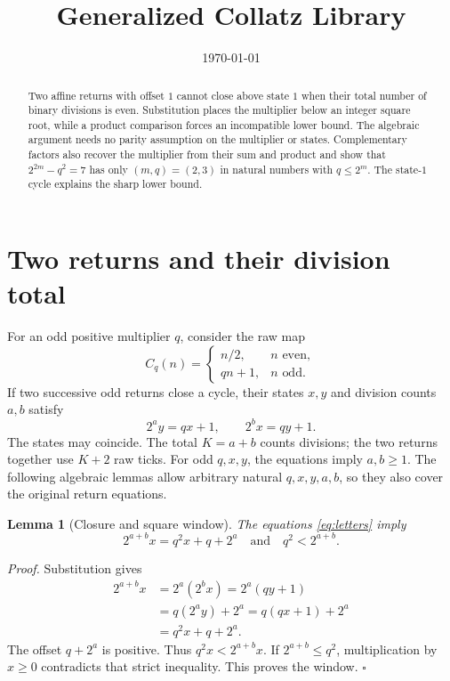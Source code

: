 \documentclass[11pt,letterpaper]{article}
\title{Generalized Collatz Library}
\author{}
\date{\today}
\newtheorem{lemma}[theorem]{Lemma}
\newenvironment{proof}{\noindent\textit{Proof.}}{\hfill\(\square\)}
\begin{document}
\maketitle

\begin{abstract}
Two affine returns with offset \(1\) cannot close above state \(1\) when
 their total number of binary divisions is even. Substitution places the
multiplier below an integer square root, while a product comparison forces
an incompatible lower bound. The algebraic argument needs no parity
assumption on the multiplier or states. Complementary factors also recover
the multiplier from their sum and product and show that
\(2^{2m}-q^2=7\) has only \((m,q)=(2,3)\) in natural numbers with
\(q\le2^m\). The state-\(1\) cycle explains the sharp lower bound.
\end{abstract}

\section{Two returns and their division total}

For an odd positive multiplier \(q\), consider the raw map
\[
C_q(n)=
\begin{cases}
n/2,&n\text{ even},\\
qn+1,&n\text{ odd}.
\end{cases}
\]
If two successive odd returns close a cycle, their states \(x,y\) and
division counts \(a,b\) satisfy
\begin{equation}
\label{eq:letters}
2^a y=qx+1,\qquad 2^b x=qy+1.
\end{equation}
The states may coincide. The total \(K=a+b\) counts divisions; the two
returns together use \(K+2\) raw ticks. For odd \(q,x,y\), the equations
imply \(a,b\ge1\). The following algebraic lemmas allow arbitrary natural
\(q,x,y,a,b\), so they also cover the original return equations.

\begin{lemma}[Closure and square window]
\label{lem:closure}
The equations \eqref{eq:letters} imply
\[
2^{a+b}x=q^2x+q+2^a
\quad\text{and}\quad
q^2<2^{a+b}.
\]
\end{lemma}

\begin{proof}
Substitution gives
\begin{align*}
2^{a+b}x
&=2^a(2^b x)=2^a(qy+1)\\
&=q(2^a y)+2^a=q(qx+1)+2^a\\
&=q^2x+q+2^a.
\end{align*}
The offset \(q+2^a\) is positive. Thus \(q^2x<2^{a+b}x\).
If \(2^{a+b}\le q^2\), multiplication by \(x\ge0\) contradicts
that strict inequality. This proves the window.
\end{proof}
\end{document}
